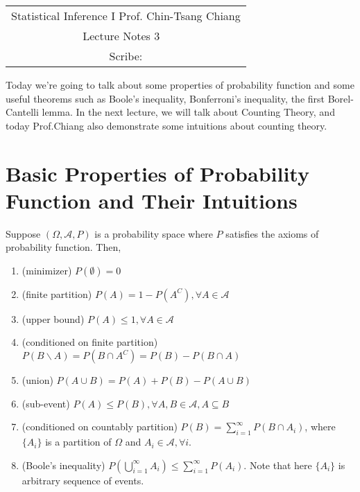 \documentclass[../Probability_Theory.tex]{subfiles}
\begin{document}
	\begin{center}
		\renewcommand{\arraystretch}{2}
		\begin{bfseries}
			\begin{tabular}{|c|}
				\hline
				Statistical Inference I \hfill Prof. Chin-Tsang Chiang\\
				\hspace{15em} {\large Lecture Notes 3} \hspace{15em}\ \\
				\lecdate \hfill Scribe: \scribe\\
				\hline
			\end{tabular}
			\renewcommand{\arraystretch}{1}
		\end{bfseries}
	\end{center}
Today we're going to talk about some properties of probability function and some useful theorems such as Boole's inequality, Bonferroni's inequality, the first Borel-Cantelli lemma. In the next lecture, we will talk about Counting Theory, and today Prof.Chiang also demonstrate some intuitions about counting theory.

\section{Basic Properties of Probability Function and Their Intuitions}
\begin{theorem}
	Suppose $(\Omega,\mathcal{A},P)$ is a probability space where $P$ satisfies the axioms of probability function. Then,
	\begin{enumerate}
		\item (minimizer) $P(\emptyset) = 0$
		\item (finite partition) $P(A) = 1-P(A^C), \forall A\in\mathcal{A}$
		\item (upper bound) $P(A)\leq1, \forall A\in\mathcal{A}$
		\item (conditioned on finite partition) $P(B\backslash A) = P(B\cap A^C) = P(B) - P(B\cap A)$
		\item (union) $P(A\cup B) = P(A) + P(B) - P(A\cup B)$
		\item (sub-event) $P(A)\leq P(B),\forall A,B\in\mathcal{A},A\subseteq B$
		\item (conditioned on countably partition) $P(B) = \sum_{i=1}^{\infty} P(B\cap A_i)$, where $\{A_i\}$ is a partition of $\Omega$ and $A_i\in\mathcal{A},\forall i$.
		\item (Boole's inequality) $P(\bigcup_{i=1}^{\infty}A_i)\leq\sum_{i=1}^{\infty}P(A_i)$. Note that here $\{A_i\}$ is arbitrary sequence of events.
	\end{enumerate}
\end{theorem}
\end{document}

